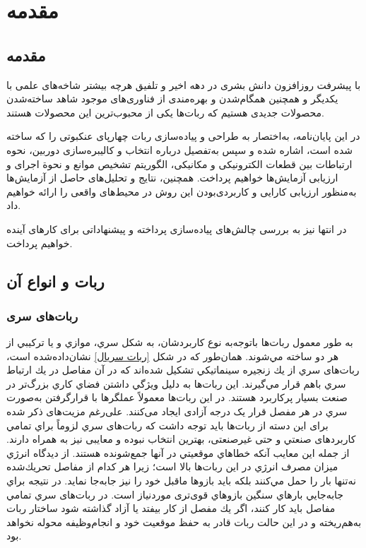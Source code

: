 \chapter{مقدمه}
\label{chapter1}
\section{مقدمه}
با پیشرفت روزافزون دانش بشری در دهه اخیر و تلفیق هرچه بیشتر شاخه‌های علمی با یکدیگر و همچنین همگام‌شدن و بهره‌مندی از فناوری‌های موجود شاهد ساخته‌شدن محصولات جدیدی هستیم که ربات‌ها یکی از محبوب‌ترین این محصولات هستند.

در این پایان‌نامه، به‌اختصار به طراحی و پیاده‌سازی ربات چهارپای عنکبوتی را که ساخته شده است، اشاره شده و سپس به‌تفصیل درباره انتخاب و کالیبره‌سازی دوربین، نحوه ارتباطات بین قطعات الکترونیکی و مکانیکی، الگوریتم تشخیص موانع و نحوة‌ اجرای و ارزیابی آزمایش‌ها خواهیم پرداخت. همچنین، نتایج و تحلیل‌های حاصل از آزمایش‌ها به‌منظور ارزیابی کارایی و کاربردی‌بودن این روش در محیط‌های واقعی را ارائه خواهیم داد.

در انتها نیز به بررسی چالش‌های پیاده‌سازی پرداخته و پیشنهاداتی برای کارهای آینده خواهیم پرداخت.


\section{ربات و انواع آن}

\subsection{ربات‌های سری}
به طور معمول ربات‌ها باتوجه‌به نوع كاربردشان، به شكل سري، موازي و يا تركيبي از هر دو ساخته مي‌شوند. همان‌طور كه در شكل
\ref{ربات سریال}
نشان‌داده‌شده است، ربات‌های سري از يك زنجيره سينماتيكي تشكيل شده‌اند كه در آن مفاصل‌ در يك ارتباط سري باهم قرار مي‌گيرند. اين ربات‌ها به دليل ويژگي داشتن فضاي كاري بزرگ‌تر در صنعت بسيار پرکاربرد هستند. در این ربات‌ها معمولاً عملگرها
\noindent\unskip{}
با قرارگرفتن به‌صورت سري در هر مفصل قرار یک درجه آزادی ایجاد می‌کنند.
علی‌رغم مزیت‌های ذکر شده برای این دسته از ربات‌ها باید توجه داشت که ربات‌های سري لزوماً براي تمامي کاربرد‌های صنعتي و حتی غیرصنعتی، بهترين انتخاب نبوده و معایبی نیز به همراه دارند. از جمله این معایب آنکه خطاهاي موقعيتي در آنها جمع‌شونده هستند.
از ديدگاه انرژي ميزان مصرف انرژي در اين ربات‌ها بالا است؛ زيرا هر كدام از مفاصل تحريك‌شده نه‌تنها بار را حمل مي‌كنند بلكه بايد بازوها ماقبل خود را نيز جابه‌جا نمايد. در نتيجه براي جابه‌جايي بارهاي سنگين بازوهاي قوی‌تری موردنیاز است. در ربات‌های سري تمامي مفاصل بايد كار كنند، اگر يك مفصل از كار بیفتد يا آزاد گذاشته شود ساختار ربات به‌هم‌ریخته و در اين حالت ربات قادر به حفظ موقعيت خود و انجام‌وظیفه
\noindent\unskip{}
محوله نخواهد بود.


